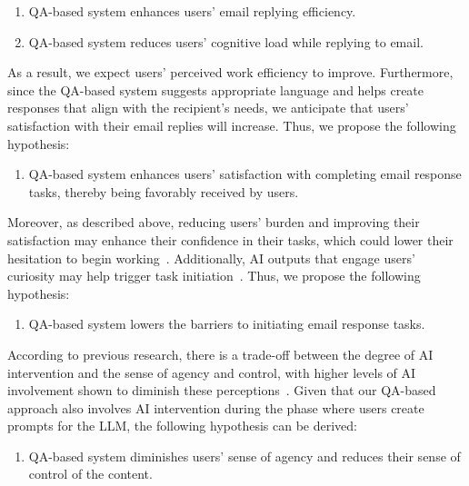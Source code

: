\begin{enumerate}[\textrm{H1-}a:]
    \item QA-based system enhances users’ email replying efficiency.
    \item QA-based system reduces users’ cognitive load while replying to email.
\end{enumerate}

As a result, we expect users’ perceived work efficiency to improve.
Furthermore, since the QA-based system suggests appropriate language and helps create responses that align with the recipient’s needs, we anticipate that users’ satisfaction with their email replies will increase.
Thus, we propose the following hypothesis:
\begin{enumerate}[\textrm{H1-}c:]
    \item QA-based system enhances users' satisfaction with completing email response tasks, thereby being favorably received by users.
\end{enumerate}

Moreover, as described above, reducing users’ burden and improving their satisfaction may enhance their confidence in their tasks, which could lower their hesitation to begin working~\cite{schouwenburg1992procrastinators}.
Additionally, AI outputs that engage users’ curiosity may help trigger task initiation~\cite{brandtzaeg2017why, ling2021factors}.
Thus, we propose the following hypothesis:
\begin{enumerate}[\textrm{H1-}d:]
    \item QA-based system lowers the barriers to initiating email response tasks.
\end{enumerate}

According to previous research, there is a trade-off between the degree of AI intervention and the sense of agency and control, with higher levels of AI involvement shown to diminish these perceptions~\cite{Fu2023Comparing, Draxler2024The}.
Given that our QA-based approach also involves AI intervention during the phase where users create prompts for the LLM, the following hypothesis can be derived:
\begin{enumerate}[\textrm{H1-}e:]
    \item QA-based system diminishes users’ sense of agency and reduces their sense of control of the content.
\end{enumerate}

